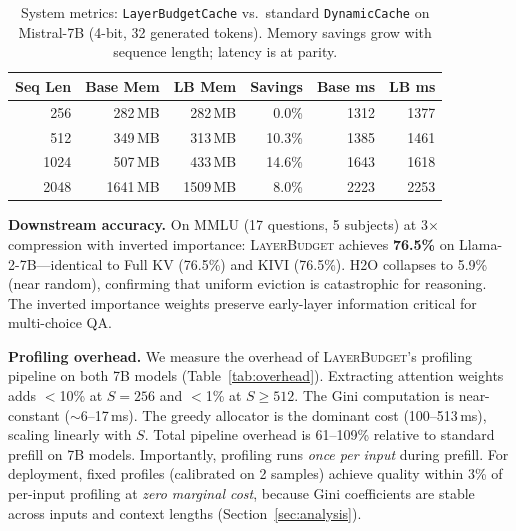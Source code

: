 \documentclass{article}
\newcommand{\layerbudget}{\textsc{LayerBudget}\xspace}
\begin{document}
\begin{table}[t]
\centering
\caption{System metrics: \texttt{LayerBudgetCache} vs.\ standard \texttt{DynamicCache} on Mistral-7B (4-bit, 32 generated tokens).
Memory savings grow with sequence length; latency is at parity.}
\label{tab:e2e_scaling}
\small
\setlength{\tabcolsep}{3pt}
\begin{tabular}{@{}rrrrrr@{}}
\toprule
Seq Len & Base Mem & LB Mem & Savings & Base ms & LB ms \\
\midrule
256  & 282\,MB & 282\,MB & 0.0\% & 1312 & 1377 \\
512  & 349\,MB & 313\,MB & 10.3\% & 1385 & 1461 \\
1024 & 507\,MB & 433\,MB & 14.6\% & 1643 & 1618 \\
2048 & 1641\,MB & 1509\,MB & 8.0\% & 2223 & 2253 \\
\bottomrule
\end{tabular}
\vspace{-0.1in}
\end{table}

\textbf{Downstream accuracy.}
On MMLU (17 questions, 5 subjects) at 3$\times$ compression with inverted importance:
\layerbudget achieves \textbf{76.5\%} on Llama-2-7B---identical to Full KV (76.5\%) and KIVI (76.5\%).
H2O collapses to 5.9\% (near random), confirming that uniform eviction is catastrophic for reasoning.
The inverted importance weights preserve early-layer information critical for multi-choice QA.

\textbf{Profiling overhead.}
We measure the overhead of \layerbudget's profiling pipeline on both 7B models (Table~\ref{tab:overhead}).
Extracting attention weights adds $<$10\% at $S = 256$ and $<$1\% at $S \geq 512$.
The Gini computation is near-constant ($\sim$6--17\,ms).
The greedy allocator is the dominant cost (100--513\,ms), scaling linearly with $S$.
Total pipeline overhead is 61--109\% relative to standard prefill on 7B models.
Importantly, profiling runs \emph{once per input} during prefill.
For deployment, fixed profiles (calibrated on 2 samples) achieve quality within 3\% of per-input profiling at \emph{zero marginal cost}, because Gini coefficients are stable across inputs and context lengths (Section~\ref{sec:analysis}).
\end{document}
